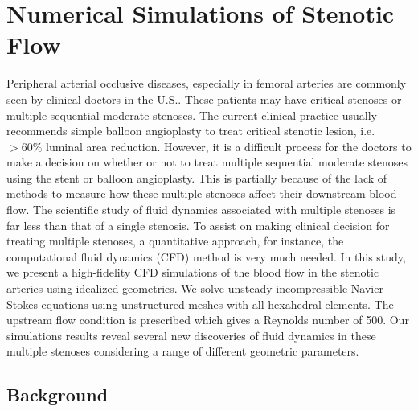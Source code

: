 \chapter{Numerical Simulations of Stenotic Flow}

Peripheral arterial occlusive diseases, especially in femoral arteries are commonly seen by clinical doctors in the U.S.\cite{malinow1989prevalence, boger1997biochemical, hooi2001incidence}. These patients may have critical stenoses or multiple sequential moderate stenoses. The current clinical practice usually recommends simple balloon angioplasty\cite{duncan1995simple} to treat critical stenotic lesion, i.e. $ > 60 \% $ luminal area reduction. However, it is a difficult process for the doctors to make a decision on whether or not to treat multiple sequential moderate stenoses using the stent or balloon angioplasty. This is partially because of the lack of methods to measure how these multiple stenoses affect their downstream blood flow. The scientific study of fluid dynamics associated with multiple stenoses is far less than that of a single stenosis. To assist on making clinical decision for treating multiple stenoses, a quantitative approach, for instance, the computational fluid dynamics (CFD) \cite{ferziger1997computational} method is very much needed. In this study,  we present a high-fidelity CFD simulations of the blood flow in the stenotic arteries using idealized geometries. We solve unsteady incompressible Navier-Stokes equations\cite{temam1984navier} using unstructured meshes with all hexahedral elements. The upstream flow condition is prescribed which gives a Reynolds number of 500. Our simulations results reveal several new discoveries of fluid dynamics in these multiple stenoses considering a range of different geometric parameters.

\section{Background}

